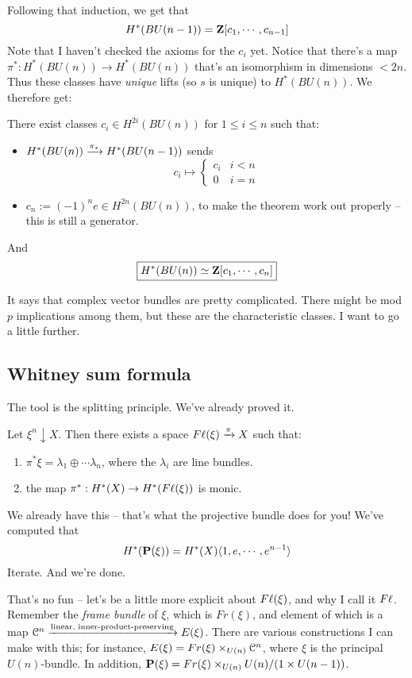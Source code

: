 Following that induction, we get that
$$
H^\ast(BU(n-1)) = \mathbf Z[c_1,\cdots,c_{n-1}]
$$
Note that I haven't checked the axioms for the $c_i$ yet.
Notice that there's a map $\pi^\ast:H^\ast(BU(n)) \to H^\ast(BU(n))$ that's an isomorphism in dimensions $<2n$.
Thus these classes have \emph{unique} lifts (so $s$ is unique) to $H^\ast(BU(n))$.
We therefore get:
\begin{theorem}
    There exist classes $c_i\in H^{2i}(BU(n))$ for $1\leq i\leq n$ such that:
    \begin{itemize}
	\item $H^\ast(BU(n)) \xrightarrow{{\pi_\ast}} H^\ast(BU(n-1))$ sends
	    $$
	    c_i \mapsto \begin{cases}
		c_i & i<n\\
		0 & i=n
	    \end{cases}
	    $$
	\item $c_n := (-1)^n e\in H^{2n}(BU(n))$, to make the theorem work out properly -- this is still a generator.
    \end{itemize}
    And
    $$
    \boxed{H^\ast(BU(n)) \simeq \mathbf Z[c_1,\cdots,c_n]}
    $$
\end{theorem}
It says that complex vector bundles are pretty complicated.
There might be mod $p$ implications among them, but these are the characteristic classes.
I want to go a little further.
\subsection{Whitney sum formula}
The tool is the splitting principle.
We've already proved it.
\begin{theorem}
    Let $\xi^n\downarrow X$.
    Then there exists a space $F\ell(\xi) \xrightarrow{{\pi}} X$ such that:
    \begin{enumerate}
	\item $\pi^\ast \xi = \lambda_1\oplus\cdots\lambda_n$, where the $\lambda_i$ are line bundles.
	\item the map $\pi^\ast: H^\ast(X) \to H^\ast(F\ell(\xi))$ is monic.
    \end{enumerate}
\end{theorem}
We already have this -- that's what the projective bundle does for you!
We've computed that
$$
H^\ast(\mathbf P(\xi)) = H^\ast(X)\langle 1,e,\cdots,e^{n-1}\rangle
$$
Iterate.
And we're done.

That's no fun -- let's be a little more explicit about $F\ell(\xi)$, and why I call it $F\ell$.
Remember the \emph{frame bundle} of $\xi$, which is $Fr(\xi)$, and element of which is a map $\mathcal C^n\xrightarrow{{\text{linear, inner-product-preserving}}}E(\xi)$.
There are various constructions I can make with this; for instance, $E(\xi) = Fr(\xi)\times_{U(n)}\mathcal C^n$, where $\xi$ is the principal $U(n)$-bundle.
In addition, $\mathbf P(\xi) = Fr(\xi)\times_{U(n)} U(n)/(1\times U(n-1))$.

